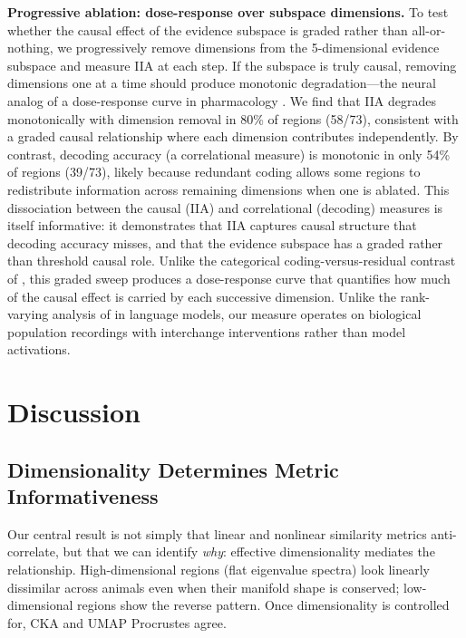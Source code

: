 \documentclass{article}
\begin{document}
\textbf{Progressive ablation: dose-response over subspace dimensions.} To test whether the causal effect of the evidence subspace is graded rather than all-or-nothing, we progressively remove dimensions from the 5-dimensional evidence subspace and measure IIA at each step. If the subspace is truly causal, removing dimensions one at a time should produce monotonic degradation---the neural analog of a dose-response curve in pharmacology \citep{pereira2025residual}. We find that IIA degrades monotonically with dimension removal in 80\% of regions (58/73), consistent with a graded causal relationship where each dimension contributes independently. By contrast, decoding accuracy (a correlational measure) is monotonic in only 54\% of regions (39/73), likely because redundant coding allows some regions to redistribute information across remaining dimensions when one is ablated. This dissociation between the causal (IIA) and correlational (decoding) measures is itself informative: it demonstrates that IIA captures causal structure that decoding accuracy misses, and that the evidence subspace has a graded rather than threshold causal role. Unlike the categorical coding-versus-residual contrast of \citet{pereira2025residual}, this graded sweep produces a dose-response curve that quantifies how much of the causal effect is carried by each successive dimension. Unlike the rank-varying analysis of \citet{lowrank2026llm} in language models, our measure operates on biological population recordings with interchange interventions rather than model activations.

\section{Discussion}

\subsection{Dimensionality Determines Metric Informativeness}

Our central result is not simply that linear and nonlinear similarity metrics anti-correlate, but that we can identify \emph{why}: effective dimensionality mediates the relationship. High-dimensional regions (flat eigenvalue spectra) look linearly dissimilar across animals even when their manifold shape is conserved; low-dimensional regions show the reverse pattern. Once dimensionality is controlled for, CKA and UMAP Procrustes agree.
\end{document}
